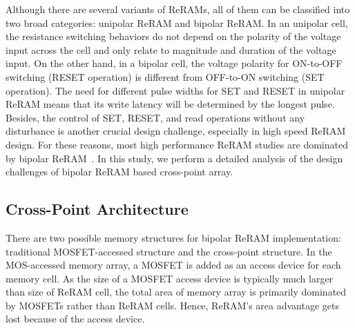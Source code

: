 
Although there are several variants of ReRAMs, all of them can be classified into two broad categories: unipolar ReRAM and bipolar ReRAM. In an unipolar cell, the resistance switching behaviors do not depend on the polarity of the voltage input across the cell and only relate to magnitude and duration of the voltage input. On the other hand, in a bipolar cell, the voltage polarity for ON-to-OFF switching (RESET operation) is different from OFF-to-ON switching (SET operation). %
The need for different pulse widths for SET and RESET in unipolar ReRAM means that its write latency will be determined by the longest pulse. Besides, the control of SET, RESET, and read operations without any disturbance is another crucial design challenge, especially in high speed ReRAM design. %
For these reasons, most high performance ReRAM studies are dominated by bipolar ReRAM~\cite{ReRAM_IEDM2010_Kim,ReRAM_ISSCC2011_Sheu,ReRAM_ISSCC2011_Otsuka}.
In this study, we perform a detailed analysis of the design challenges of bipolar ReRAM based cross-point array.

\subsection{Cross-Point Architecture}
There are two possible memory structures for bipolar ReRAM implementation: traditional MOSFET-accessed structure and the cross-point structure. In the MOS-accessed memory array, a MOSFET is added as an access device for each memory cell. As the size of a MOSFET access device is typically much larger than size of ReRAM cell, the total area of memory array is primarily dominated by MOSFETs rather than ReRAM cells. Hence, ReRAM's area advantage gets lost because of the access device. %

